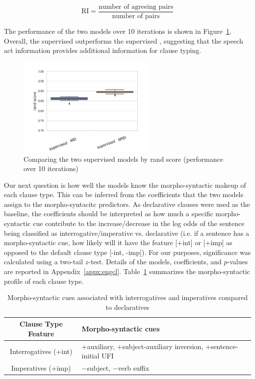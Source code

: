 $$ \mbox{RI} =\frac{ \mbox{number of agreeing pairs}}{ \mbox{number of pairs}} $$


The performance of the two models over 10 iterations is shown in Figure~\ref{fig:super-compare-rand}. Overall, the supervised \praglearner{} outperforms the supervised \distlearner{}, suggesting that the speech act information provides additional information for clause typing.


\begin{figure}[H]
    \centering
    \includegraphics[width=0.6\textwidth]{figures/super-compare-rand-name.jpg}
    \caption{Comparing the two supervised models by rand score (performance over 10 iterations)}
    \label{fig:super-compare-rand}
\end{figure}



Our next question is how well the models know the morpho-syntactic makeup of each clause type. This can be inferred from the coefficients that the two models assign to the morpho-syntacitc predictors. As declarative clauses were used as the baseline, the coefficients should be interpreted as how much a specific morpho-syntactic cue contribute to the increase/decrease in the log odds of the sentence being classified as interrogative/imperative vs. declarative (i.e. if a sentence has a morpho-syntactic cue, how likely will it have the feature [+int] or [+imp] as opposed to the default clause type [-int, -imp]). For our purposes, significance was calculated using a two-tail $z$-test. Details of the models, coefficients, and $p$-values are reported in Appendix~\ref{appx:engcl}. Table~\ref{tab:engcl:corpus:formal} summarizes the morpho-syntactic profile of each clause type.

\begin{table}[H]
\begin{center}
\begin{tabular}{c|p{10cm}}
\hline
Clause Type Feature & Morpho-syntactic cues\\
\hline \hline
Interrogatives (+int) & +auxiliary, +subject-auxiliary inversion, +sentence-initial UFI\\
\hline
Imperatives (+imp) & $-$subject, $-$verb suffix\\
\hline \hline
\end{tabular}
\end{center}
\caption{Morpho-syntactic cues associated with interrogatives and imperatives compared to declaratives}
\label{tab:engcl:corpus:formal}
\end{table}%


